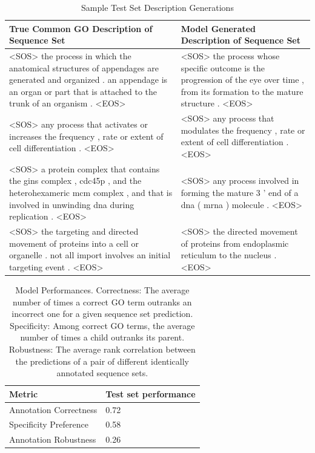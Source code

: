 \documentclass{specification}
\begin{document}
\begin{table}
	\caption{Sample Test Set Description Generations}
	\centering
    \begin{tabular}{p{8 cm}|p{8 cm}}
		\toprule
        True Common GO Description of Sequence Set & Model Generated Description of Sequence Set \\
		\midrule
        <SOS> the process in which the anatomical structures of appendages are generated and organized . an appendage is an organ or part that is attached to the trunk of an organism . <EOS> & <SOS> the process whose specific outcome is the progression of the eye over time , from its formation to the mature structure . <EOS> \\ \hline
        <SOS> any process that activates or increases the frequency , rate or extent of cell differentiation . <EOS> & <SOS> any process that modulates the frequency , rate or extent of cell differentiation . <EOS> \\ \hline
		<SOS> a protein complex that contains the gins complex , cdc45p , and the heterohexameric mcm complex , and that is involved in unwinding dna during replication . <EOS> & <SOS> any process involved in forming the mature 3 ' end of a dna ( mrna ) molecule . <EOS> \\
        \hline
        <SOS> the targeting and directed movement of proteins into a cell or organelle . not all import involves an initial targeting event . <EOS> & <SOS> the directed movement of proteins from endoplasmic reticulum to the nucleus . <EOS>  \\
		\bottomrule
	\end{tabular}
\end{table}

\begin{table}
	\caption{Model Performances. Correctness: The average number of times a correct GO term outranks an incorrect one for a given sequence set prediction. Specificity: Among correct GO terms, the average number of times a child outranks its parent. Robustness: The average rank correlation between the predictions of a pair of different identically annotated sequence sets.}
	\centering
	\begin{tabular}{l|l}
		\toprule
        Metric & Test set performance \\
		\midrule
        Annotation Correctness &  0.72 \\
        Specificity Preference &  0.58 \\
		Annotation Robustness &  0.26 \\
		\bottomrule
	\end{tabular}
	\label{tab:table}
\end{table}
\end{document}
